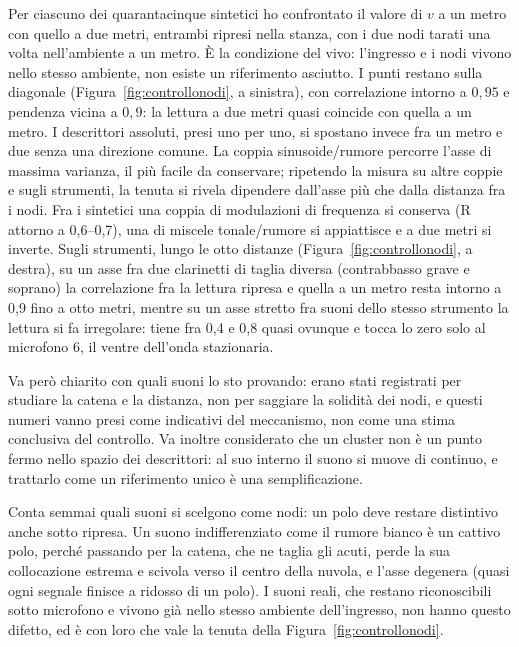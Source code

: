 \documentclass{article}
\begin{document}
 Per ciascuno dei quarantacinque sintetici ho confrontato il valore di $v$ a un metro con quello a due metri, entrambi ripresi nella stanza, con i due nodi tarati una volta nell'ambiente a un metro. È la condizione del vivo: l'ingresso e i nodi vivono nello stesso ambiente, non esiste un riferimento asciutto. I punti restano sulla diagonale (Figura~\ref{fig:controllonodi}, a sinistra), con correlazione intorno a $0{,}95$ e pendenza vicina a $0{,}9$: la lettura a due metri quasi coincide con quella a un metro. I descrittori assoluti, presi uno per uno, si spostano invece fra un metro e due senza una direzione comune. La coppia sinusoide/rumore percorre l'asse di massima varianza, il più facile da conservare; ripetendo la misura su altre coppie e sugli strumenti, la tenuta si rivela dipendere dall'asse più che dalla distanza fra i nodi. Fra i sintetici una coppia di modulazioni di frequenza si conserva (R attorno a 0,6--0,7), una di miscele tonale/rumore si appiattisce e a due metri si inverte. Sugli strumenti, lungo le otto distanze (Figura~\ref{fig:controllonodi}, a destra), su un asse fra due clarinetti di taglia diversa (contrabbasso grave e soprano) la correlazione fra la lettura ripresa e quella a un metro resta intorno a 0,9 fino a otto metri, mentre su un asse stretto fra suoni dello stesso strumento la lettura si fa irregolare: tiene fra 0,4 e 0,8 quasi ovunque e tocca lo zero solo al microfono 6, il ventre dell'onda stazionaria.

Va però chiarito con quali suoni lo sto provando: erano stati registrati per studiare la catena e la distanza, non per saggiare la solidità dei nodi, e questi numeri vanno presi come indicativi del meccanismo, non come una stima conclusiva del controllo. Va inoltre considerato che un cluster non è un punto fermo nello spazio dei descrittori: al suo interno il suono si muove di continuo, e trattarlo come un riferimento unico è una semplificazione.

Conta semmai quali suoni si scelgono come nodi: un polo deve restare distintivo anche sotto ripresa. Un suono indifferenziato come il rumore bianco è un cattivo polo, perché passando per la catena, che ne taglia gli acuti, perde la sua collocazione estrema e scivola verso il centro della nuvola, e l'asse degenera (quasi ogni segnale finisce a ridosso di un polo). I suoni reali, che restano riconoscibili sotto microfono e vivono già nello stesso ambiente dell'ingresso, non hanno questo difetto, ed è con loro che vale la tenuta della Figura~\ref{fig:controllonodi}.
\end{document}
